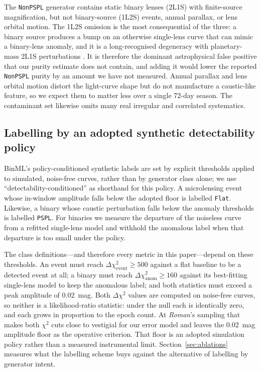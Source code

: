 \documentclass[twocolumn,linenumbers,floatfix,twocolappendix]{aastex701}
\newcommand{\Rom}{\textit{Roman}}
\begin{document}
The \texttt{NonPSPL} generator contains static binary lenses (2L1S) with finite-source
magnification, but not binary-source (1L2S) events, annual parallax, or lens orbital motion. The
1L2S omission is the most consequential of the three: a binary source produces a bump on an
otherwise single-lens curve that can mimic a binary-lens anomaly, and it is a long-recognised
degeneracy with planetary-mass 2L1S perturbations \citep{Gaudi1998}. It is therefore the dominant
astrophysical false positive that our purity estimate does not contain, and adding it would
lower the reported \texttt{NonPSPL} purity by an amount we have not measured. Annual parallax
and lens orbital motion distort the light-curve shape but do not manufacture a caustic-like
feature, so we expect them to matter less over a single 72-day season. The contaminant set
likewise omits many real irregular and correlated systematics.

\subsection{Labelling by an adopted synthetic detectability policy}\label{sec:detcond}
BinML's policy-conditioned synthetic labels are set by explicit thresholds applied to simulated,
noise-free curves, rather than by generator class alone; we use ``detectability-conditioned'' as
shorthand for this policy. A microlensing event whose in-window amplitude falls below the adopted
floor is labelled \texttt{Flat}. Likewise, a binary whose caustic perturbation falls below the
anomaly thresholds is labelled \texttt{PSPL}. For binaries we measure the departure of the
noiseless curve from a refitted single-lens model and withhold the anomalous label when that
departure is too small under the policy.

The class definitions---and therefore every metric in this paper---depend on these thresholds. An
event must reach $\Delta\chi^{2}_{\mathrm{event}} \ge 500$ against a flat baseline to be a
detected event at all; a binary must reach $\Delta\chi^{2}_{\mathrm{anom}} \ge 160$ against its
best-fitting single-lens model to keep the anomalous label; and both statistics must exceed a peak
amplitude of $0.02$~mag. Both $\Delta\chi^{2}$ values are computed on noise-free curves, so neither
is a likelihood-ratio statistic: under the null each is identically zero, and each grows in
proportion to the epoch count. At \Rom{}'s sampling that makes both $\chi^{2}$ cuts close to
vestigial for our error model and leaves the $0.02$~mag amplitude floor as the operative criterion. That floor is an
adopted simulation policy rather than a measured instrumental limit. Section~\ref{sec:ablations}
measures what the labelling scheme buys against the alternative of labelling by generator intent.
\end{document}
